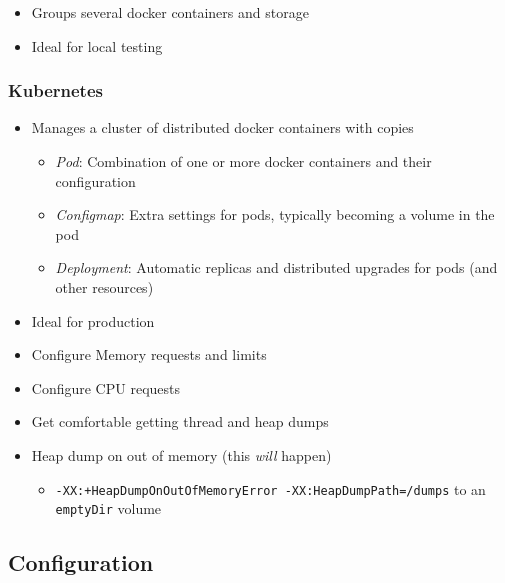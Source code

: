 \documentclass[8pt]{article}
\begin{document}
\begin{itemize}
\item Groups several docker containers and storage
\item Ideal for local testing
\end{itemize}
\subsubsection{Kubernetes}
\label{sec:org6d55a0f}
\begin{itemize}
\item Manages a cluster of distributed docker containers with copies
\begin{itemize}
\item \emph{Pod}: Combination of one or more docker containers and their configuration
\item \emph{Configmap}: Extra settings for pods, typically becoming a volume in the pod
\item \emph{Deployment}: Automatic replicas and distributed upgrades for pods (and other resources)
\end{itemize}
\item Ideal for production
\item Configure Memory requests and limits
\item Configure CPU requests
\item Get comfortable getting thread and heap dumps
\item Heap dump on out of memory (this \emph{will} happen)
\begin{itemize}
\item \texttt{-XX:+HeapDumpOnOutOfMemoryError -XX:HeapDumpPath=/dumps} to an \texttt{emptyDir} volume
\end{itemize}
\end{itemize}
\subsection{Configuration}
\label{sec:org259f2f7}
\end{document}
